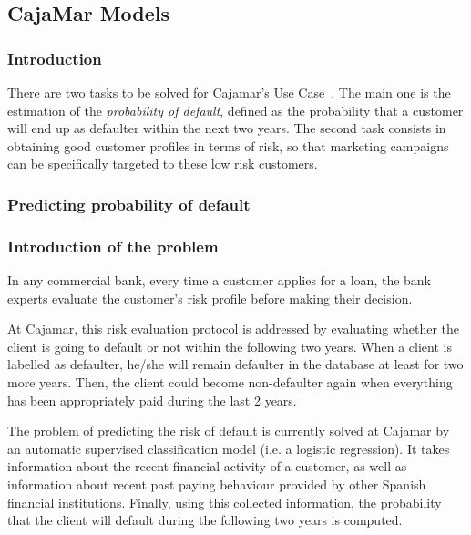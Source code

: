 

\newpage
\newpage
\newcommand{\X}{\mathbf{X}}
\newcommand{\Y}{\mathbf{Y}}
\newcommand{\Z}{\mathbf{Z}}
\newcommand{\x}{\mathbf{x}}
\newcommand{\argmax}[1]{\underset{#1}{\operatorname{arg}\,\operatorname{max}}\;}


\subsection{CajaMar Models}
\label{Section:CajaMarModels}

\subsubsection{Introduction}

There are two tasks to be solved for Cajamar's Use Case~\cite{Fer14b}. The main one is the estimation of the \emph{probability of default}, defined as the probability that a
customer will end up as defaulter within the next two years. The second task consists in obtaining good customer profiles in terms of risk, so that marketing campaigns can be specifically targeted to these low risk customers. 

\subsubsection{Predicting probability of default}
\label{SubSection:Predicting}

\subsubsection*{Introduction of the problem} 

In any commercial bank, every time a customer applies for a loan, the bank experts evaluate the customer's risk profile before making their decision. 

At Cajamar, this risk evaluation protocol is addressed by evaluating whether the client is going to default or not within the following two years. When a client is labelled as defaulter, he/she will remain defaulter in the database at least for two more years. Then, the client could become non-defaulter again when everything has been appropriately paid during the last 2 years. 

The problem of predicting the risk of default is currently solved at Cajamar by an automatic supervised classification model (i.e. a logistic regression). It takes information about the recent financial activity of a customer, as well as information about recent past paying behaviour provided by other Spanish financial institutions. Finally, using this collected information, the probability that the client will default during the following two years is computed. 

